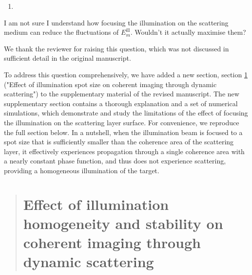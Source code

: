 \documentclass[12pt]{article}
\newenvironment{solved_reviewercomment}
    {\begin{tcolorbox}[width=\linewidth,colback=gray!5,colframe=solved_commentcolor!50,title=Reviewer Comment,left=5pt,right=5pt]}
    {\end{tcolorbox}}
\newenvironment{finished_ourresponse}
    {\begin{tcolorbox}[width=\linewidth,breakable,enhanced,colback=gray!5,colframe=finished_responsecolor!50,title=Response,left=5pt,right=5pt]}
    {\end{tcolorbox}}
\begin{document}
        
\begin{enumerate}[label=\arabic*., resume]
\item \leavevmode
\end{enumerate}
\vspace{-1em}
\begin{solved_reviewercomment}
    I am not sure I understand how focusing the illumination on the scattering medium can reduce the fluctuations of \(E^{\text{ill}}_m\). Wouldn't it actually maximise them?    
\end{solved_reviewercomment}

\begin{finished_ourresponse}
We thank the reviewer for raising this question, which was not discussed in sufficient detail in the original manuscript.

To address this question comprehensively, we have added a new section, section \ref{sec: effect of spot size} ("Effect of illumination spot size on coherent imaging through dynamic scattering") to the supplementary material of the revised manuscript. The new supplementary section contains a thorough explanation and a set of numerical simulations, which demonstrate and study the limitations of the effect of focusing the illumination on the scattering layer surface. For convenience, we reproduce the full section below. In a nutshell, when the illumination beam is focused to a spot size that is sufficiently smaller than the coherence area of the scattering layer, it effectively experiences propagation through a single coherence area with a nearly constant phase function, and thus does not experience scattering, providing a homogeneous illumination of the target.
\begin{quote}
    {\bfseries
    \setcounter{section}{4}
        \section{Effect of illumination homogeneity and stability on coherent imaging through dynamic scattering}
    \label{sec: effect of spot size}
    

}
\end{quote}
\end{finished_ourresponse}
\end{document}
